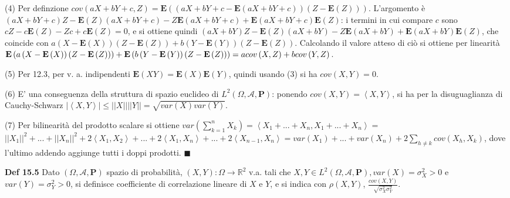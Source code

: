 \documentclass{article}
\begin{document}
(4) Per definzione $cov\left( aX+bY+c,Z\right) =\mathbf{E}\left( \left(
aX+bY+c-\mathbf{E}\left( aX+bY+c\right) \right) \left( Z-\mathbf{E}\left(
Z\right) \right) \right) $. L'argomento \`{e} $\left( aX+bY+c\right) Z-%
\mathbf{E}\left( Z\right) \left( aX+bY+c\right) -Z\mathbf{E}\left(
aX+bY+c\right) +\mathbf{E}\left( aX+bY+c\right) \mathbf{E}\left( Z\right) $:
i termini in cui compare $c$ sono $cZ-c\mathbf{E}\left( Z\right) -Zc+c%
\mathbf{E}\left( Z\right) =0$, e si ottiene quindi $\left( aX+bY\right) Z-%
\mathbf{E}\left( Z\right) \left( aX+bY\right) -Z\mathbf{E}\left(
aX+bY\right) +\mathbf{E}\left( aX+bY\right) \mathbf{E}\left( Z\right) $, che
coincide con $a\left( X-\mathbf{E}\left( X\right) \right) \left( Z-\mathbf{E}%
\left( Z\right) \right) +b\left( Y-\mathbf{E}\left( Y\right) \right) \left(
Z-\mathbf{E}\left( Z\right) \right) $. Calcolando il valore atteso di ci\`{o}
si ottiene per linearit\`{a} $\mathbf{E}\left( a\left( X-\mathbf{E}\left(
X\right) \right) \left( Z-\mathbf{E}\left( Z\right) \right) \right) +\mathbf{%
E}\left( b\left( Y-\mathbf{E}\left( Y\right) \right) \left( Z-\mathbf{E}%
\left( Z\right) \right) \right) =acov\left( X,Z\right) +bcov\left(
Y,Z\right) $.

(5) Per 12.3, per v. a. indipendenti $\mathbf{E}\left( XY\right) =\mathbf{E}%
\left( X\right) \mathbf{E}\left( Y\right) $, quindi usando (3) si ha $%
cov\left( X,Y\right) =0$.

(6) E' una conseguenza della struttura di spazio euclideo di $L^{2}\left(
\Omega ,\mathcal{A},\mathbf{P}\right) $: ponendo $cov\left( X,Y\right)
=\left\langle X,Y\right\rangle $, si ha per la disuguaglianza di
Cauchy-Schwarz $\left\vert \left\langle X,Y\right\rangle \right\vert \leq
\left\vert \left\vert X\right\vert \right\vert \left\vert \left\vert
Y\right\vert \right\vert =\sqrt{var\left( X\right) var\left( Y\right) }$.

(7) Per bilinearit\`{a} del prodotto scalare si ottiene $var\left(
\sum_{k=1}^{n}X_{k}\right) =\left\langle
X_{1}+...+X_{n},X_{1}+...+X_{n}\right\rangle =$ $\left\vert \left\vert
X_{1}\right\vert \right\vert ^{2}+...+\left\vert \left\vert X_{n}\right\vert
\right\vert ^{2}+2\left\langle X_{1},X_{2}\right\rangle +...+2\left\langle
X_{1},X_{n}\right\rangle +...+2\left\langle X_{n-1},X_{n}\right\rangle
=var\left( X_{1}\right) +...+var\left( X_{n}\right) +2\sum_{h\neq
k}cov\left( X_{h},X_{k}\right) $, dove l'ultimo addendo aggiunge tutti i
doppi prodotti. $\blacksquare $

\textbf{Def 15.5} Dato $\left( \Omega ,\mathcal{A},\mathbf{P}\right) $
spazio di probabilit\`{a}, $\left( X,Y\right) :\Omega \rightarrow 
\mathbb{R}
^{2}$ v.a. tali che $X,Y\in L^{2}\left( \Omega ,\mathcal{A},\mathbf{P}%
\right) ,var\left( X\right) =\sigma _{X}^{2}>0$ e $var\left( Y\right)
=\sigma _{Y}^{2}>0$, si definisce coefficiente di correlazione lineare di $X$
e $Y$, e si indica con $\rho \left( X,Y\right) $, $\frac{cov\left(
X,Y\right) }{\sqrt{\sigma _{X}^{2}\sigma _{Y}^{2}}}$.
\end{document}
